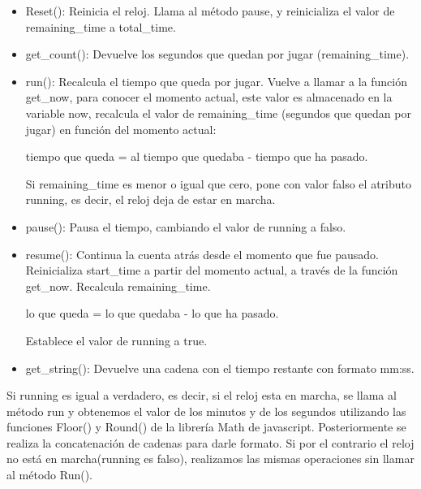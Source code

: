 \begin{itemize}
 \item Reset(): Reinicia el reloj. Llama al método pause, y reinicializa el valor de remaining\_time a total\_time.

 \item get\_count(): Devuelve los segundos que quedan por jugar (remaining\_time).

 \item run(): Recalcula el tiempo que queda por jugar. Vuelve a llamar a la función get\_now, para conocer el momento actual, este valor es almacenado 
en la variable now, recalcula el valor de remaining\_time (segundos que quedan por jugar) en función del momento actual:

        tiempo que queda = al tiempo que quedaba - tiempo que ha pasado.
        
Si remaining\_time es menor o igual que cero, pone con valor falso el atributo running, es decir, el reloj deja de estar en marcha.

 \item pause(): Pausa el tiempo, cambiando el valor de running a falso.

 \item resume(): Continua la cuenta atrás desde el momento que fue pausado. Reinicializa start\_time a partir del momento actual, a través de la 
 función get\_now. Recalcula remaining\_time.

        lo que queda = lo que quedaba - lo que ha pasado.

Establece el valor de running a true.

 \item get\_string(): Devuelve una cadena con el tiempo restante con formato mm:ss.
\end{itemize}

Si running es igual a verdadero, es decir, si el reloj esta en marcha, se llama al método run y obtenemos el valor de los minutos y de los 
segundos utilizando las funciones Floor() y Round() de la librería Math de javascript. Posteriormente se realiza la concatenación de cadenas para 
darle formato. Si por el contrario el reloj no está en marcha(running es falso), realizamos las mismas operaciones sin llamar al método Run().

